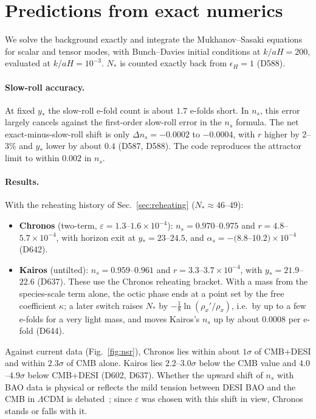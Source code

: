 \documentclass[aps,prd,twocolumn,superscriptaddress,nofootinbib,floatfix]{revtex4-2}
\begin{document}
\section{Predictions from exact numerics}\label{sec:predictions}
We solve the background exactly and integrate the Mukhanov--Sasaki equations for scalar and tensor modes, with Bunch--Davies initial conditions at $k/aH = 200$, evaluated at $k/aH = 10^{-3}$. $N_*$ is counted exactly back from $\epsilon_H = 1$ (D588).

\paragraph{Slow-roll accuracy.} At fixed $y_*$ the slow-roll e-fold count is about $1.7$ e-folds short. In $n_s$, this error largely cancels against the first-order slow-roll error in the $n_s$ formula. The net exact-minus-slow-roll shift is only $\Delta n_s = -0.0002$ to $-0.0004$, with $r$ higher by 2--3\% and $y_*$ lower by about $0.4$ (D587, D588). The code reproduces the attractor limit to within $0.002$ in $n_s$.

\paragraph{Results.} With the reheating history of Sec.~\ref{sec:reheating} ($N_* \approx 46$--$49$):
\begin{itemize}
\item \textbf{Chronos} (two-term, $\varepsilon = 1.3$--$1.6\times10^{-4}$): $n_s = 0.970$--$0.975$ and $r = 4.8$--$5.7\times10^{-4}$, with horizon exit at $y_* = 23$--$24.5$, and $\alpha_s=-(8.8$--$10.2)\times10^{-4}$ (D642).
\item \textbf{Kairos} (untilted): $n_s = 0.959$--$0.961$ and $r = 3.3$--$3.7\times10^{-4}$, with $y_* = 21.9$--$22.6$ (D637). These use the Chronos reheating bracket. With a mass from the species-scale term alone, the octic phase ends at a point set by the free coefficient $\kappa$; a later switch raises $N_*$ by $-\tfrac18\ln(\rho_x'/\rho_x)$, i.e.\ by up to a few e-folds for a very light mass, and moves Kairos's $n_s$ up by about $0.0008$ per e-fold (D644).
\end{itemize}
Against current data (Fig.~\ref{fig:nsr}), Chronos lies within about $1\sigma$ of CMB+DESI and within $2.3\sigma$ of CMB alone. Kairos lies $2.2$--$3.0\sigma$ below the CMB value and $4.0$--$4.9\sigma$ below CMB+DESI (D602, D637). Whether the upward shift of $n_s$ with BAO data is physical or reflects the mild tension between DESI BAO and the CMB in $\Lambda$CDM is debated~\cite{arXiv_2503_14738}; since $\varepsilon$ was chosen with this shift in view, Chronos stands or falls with it.
\end{document}
